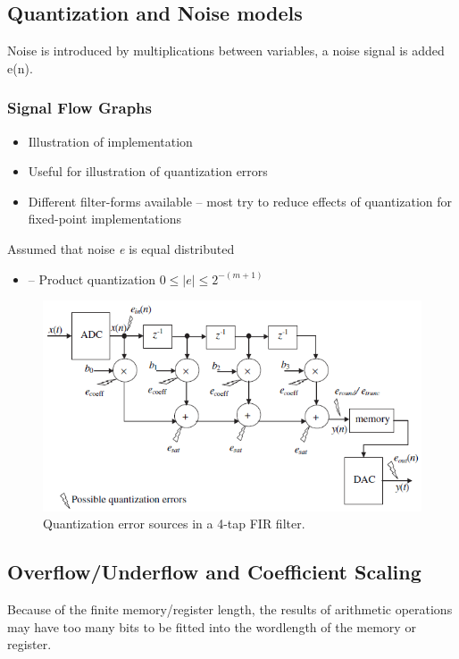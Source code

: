 \subsection{Quantization and Noise models}
Noise is introduced by multiplications between variables, a noise signal is added e(n).
\subsubsection{Signal Flow Graphs}
\begin{itemize}
	\item Illustration of implementation
	\item Useful for illustration of quantization errors
	\item Different filter-forms available – most try to reduce effects of quantization for fixed-point implementations
\end{itemize}

Assumed that noise \textit{e} is equal distributed
\begin{itemize}
	\item – Product quantization $0 \leq |e| \leq 2^{-(m+1)}$
\end{itemize}

\begin{figure} [H]
	\centering
	\includegraphics[width=\linewidth]{graphics/10.png}
	\caption{Quantization error sources in a 4-tap FIR filter.}
	\label{fig:10}
\end{figure}

\subsection{Overflow/Underflow and Coefficient Scaling}
Because of the finite memory/register length, the results of arithmetic operations may have too many bits to be fitted into the wordlength of the memory or register.

